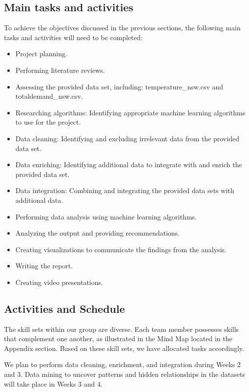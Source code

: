 \documentclass[mstat,12pt]{unswthesis}
\def\tightlist{}
\begin{document}
\hypertarget{main-tasks-and-activities}{%
\subsection{Main tasks and activities}\label{main-tasks-and-activities}}

To achieve the objectives discussed in the previous sections, the
following main tasks and activities will need to be completed:

\begin{itemize}
\tightlist
\item
  Project planning.
\item
  Performing literature reviews.
\item
  Assessing the provided data set, including: temperature\_nsw.csv and
  totaldemand\_nsw.csv.
\item
  Researching algorithms: Identifying appropriate machine learning
  algorithms to use for the project.
\item
  Data cleaning: Identifying and excluding irrelevant data from the
  provided data set.
\item
  Data enriching: Identifying additional data to integrate with and
  enrich the provided data set.
\item
  Data integration: Combining and integrating the provided data sets
  with additional data.
\item
  Performing data analysis using machine learning algorithms.
\item
  Analyzing the output and providing recommendations.
\item
  Creating visualizations to communicate the findings from the analysis.
\item
  Writing the report.
\item
  Creating video presentations.
\end{itemize}

\hypertarget{activities-and-schedule-1}{%
\subsection{Activities and Schedule}\label{activities-and-schedule-1}}

The skill sets within our group are diverse. Each team member possesses
skills that complement one another, as illustrated in the Mind Map
located in the Appendix section. Based on these skill sets, we have
allocated tasks accordingly.

We plan to perform data cleaning, enrichment, and integration during
Weeks 2 and 3. Data mining to uncover patterns and hidden relationships
in the datasets will take place in Weeks 3 and 4.
\end{document}
